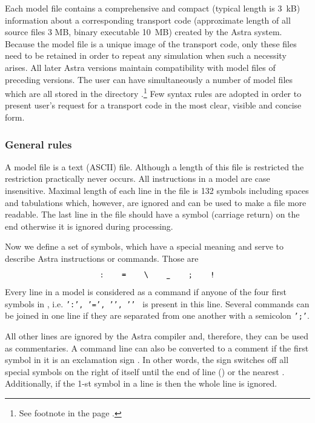 Each model file contains a comprehensive and compact (typical length is
3~kB) information about a corresponding transport code (approximate
length of all source files 3 MB, binary executable 10~MB) created by the
Astra system. 
Because the model file is a unique image of the transport code, only
these files need to be retained in order to repeat any simulation when
such a necessity arises.
All later Astra versions maintain compatibility with model files of
preceding versions. 
The user can have simultaneously a number of model files which are all
stored in the directory .\footnote
{See footnote in the page \pageref{AWD}.} 
Few syntax rules are adopted in order to present user's request for
a transport code in the most clear, visible and concise form.

\subsubsection{General rules}

A model file is a text (ASCII) file.
Although a length of this file is restricted the restriction practically
never occurs. 
All instructions in a model are case insensitive.
Maximal length of each line in the file is 132 symbols including spaces
and tabulations which, however, are ignored and can be used to make a
file more readable.
The last line in the file should have a symbol  (carriage
return) on the end otherwise it is ignored  during processing.

Now we define a set of symbols, which have a special meaning
and serve to describe Astra instructions or commands. 
Those are
\begin{equation}\label{specsym}
\mbox{\tt :\qq =\qq\bs \qq\symbol{95}\qq ;\qq !}
\end{equation}
Every line in a model is considered as a command if anyone of the four
first symbols in , i.e. 
{\tt ':', '=', '\bs ', ''~} 
is present in this line.
Several commands can be joined in one line if they are separated 
from one another with a semicolon {\tt ';'}.

All other lines are ignored by the Astra compiler and, therefore, they
can be used as commentaries.
A command line can also be converted to a comment if the first symbol
in it is an exclamation sign .
In other words, the sign  switches off all special symbols on 
the right of itself until the end of line () or the nearest
. 
Additionally, if the 1-st symbol in a line is  then the whole
line is ignored.

